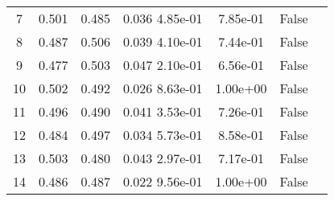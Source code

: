 \begin{tabular}{c|c|c|c|c|c|c}
  7 & 0.501 &   0.485 &   0.036   4.85e-01 &   7.85e-01 &  False\\
  8 & 0.487 &   0.506 &   0.039   4.10e-01 &   7.44e-01 &  False\\
  9 & 0.477 &   0.503 &   0.047   2.10e-01 &   6.56e-01 &  False\\
 10 & 0.502 &   0.492 &   0.026   8.63e-01 &   1.00e+00 &  False\\
 11 & 0.496 &   0.490 &   0.041   3.53e-01 &   7.26e-01 &  False\\
 12 & 0.484 &   0.497 &   0.034   5.73e-01 &   8.58e-01 &  False\\
 13 & 0.503 &   0.480 &   0.043   2.97e-01 &   7.17e-01 &  False\\
 14 & 0.486 &   0.487 &   0.022   9.56e-01 &   1.00e+00 &  False\\
\end{tabular}